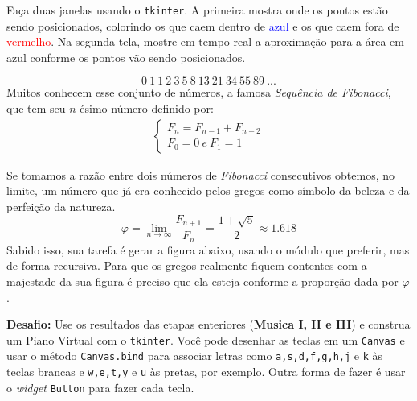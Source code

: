 \documentclass[12pt]{article}
\begin{document}
	Faça duas janelas usando o \texttt{tkinter}. A primeira mostra onde os pontos estão sendo posicionados, colorindo os que caem dentro de \textcolor{blue}{azul} e os que caem fora de \textcolor{red}{vermelho}. Na segunda tela, mostre em tempo real a aproximação para a área em azul conforme os pontos vão sendo posicionados. \\
	
	
	
	\[0\ 1\ 1\ 2\ 3\ 5\ 8\ 13\ 21\ 34\ 55\ 89\ ... \]	
	Muitos conhecem esse conjunto de números, a famosa \emph{Sequência de Fibonacci}, que tem seu $n$-ésimo número definido por:
	\begin{align*}
	\begin{cases}
	F_{n} = F_{n-1} + F_{n-2}\\
	F_{0} = 0 \ e \ F_{1} = 1
	\end{cases}
	\end{align*}
	
	Se tomamos a razão entre dois números de \emph{Fibonacci} consecutivos obtemos, no limite, um número que já era conhecido pelos gregos como símbolo da beleza e da perfeição da natureza.
	$$\varphi = \lim_{n \to \infty} \frac{F_{n+1}}{F_{n}}= \frac{1+\sqrt{5}}{2} \approx 1.618 $$
	Sabido isso, sua tarefa é gerar a figura abaixo, usando o módulo que preferir, mas de forma recursiva. Para que os gregos realmente fiquem contentes com a majestade da sua figura é preciso que ela esteja conforme a proporção dada por $\varphi$.
	
	
	
	\textbf{Desafio:} Use os resultados das etapas enteriores (\textbf{Musica I, II e III}) e construa um Piano Virtual com o \texttt{tkinter}. Você pode desenhar as teclas em um \texttt{Canvas} e usar o método \texttt{Canvas.bind} para associar letras como \texttt{a,s,d,f,g,h,j} e \texttt{k} às teclas brancas e \texttt{w,e,t,y} e \texttt{u} às pretas, por exemplo. Outra forma de fazer é usar o \textit{widget} \texttt{Button} para fazer cada tecla.


\end{document}
